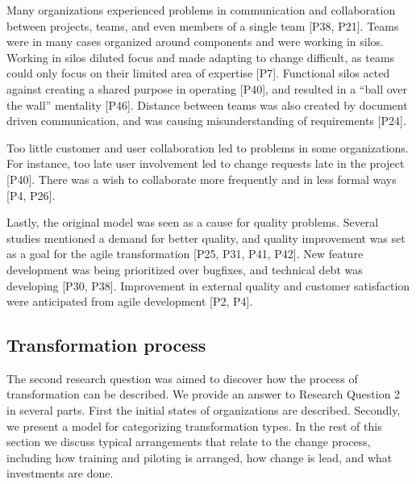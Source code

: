 Many organizations experienced problems in communication and collaboration
between projects, teams, and even members of a single team [P38, P21].
Teams were in many cases organized around components and were working in silos.
Working in silos diluted focus and made adapting to change difficult, as teams
could only focus on their limited area of expertise [P7]. Functional silos acted
against creating a shared purpose in operating [P40], and resulted in a ``ball
over the wall'' mentality [P46]. Distance between teams was also created by
document driven communication, and was causing misunderstanding of requirements
[P24].

Too little customer and user collaboration led to problems in some
organizations. For instance, too late user involvement led to change requests
late in the project [P40]. There was a wish to collaborate more frequently and
in less formal ways [P4, P26].


% 

Lastly, the original model was seen as a cause for quality problems.
Several studies mentioned a demand for better quality, and quality improvement
was set as a goal for the agile transformation [P25, P31, P41, P42]. New feature
development was being prioritized over bugfixes, and technical debt was
developing [P30, P38]. Improvement in external quality and customer satisfaction
were anticipated from agile development [P2, P4].


\clearpage

\subsection{Transformation process}

The second research question was aimed to discover how the process of
transformation can be described.
We provide an answer to Research Question 2 in several parts. First the initial
states of organizations are described. Secondly, we present a model for
categorizing transformation types. In the rest of this section we discuss
typical arrangements that relate to the change process, including how training
and piloting is arranged, how change is lead, and what investments are done.


